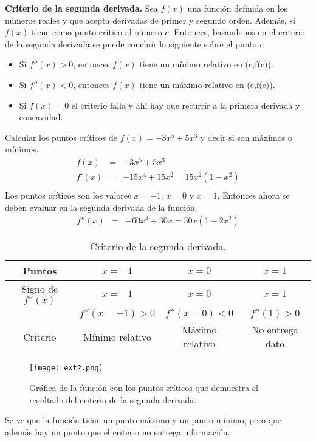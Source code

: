 \begin{mydef}
\textbf{Criterio de la segunda derivada. } Sea $f(x)$ una función definida en los números reales y que acepta derivadas de primer y segundo orden. Además, si $f(x)$ tiene como punto crítico al número $c$. Entonces, basandonos en el criterio de la segunda derivada se puede concluir lo siguiente sobre el punto $c$
\begin{itemize}
 \item Si $f''(x)>0$, entonces $f(x)$ tiene un mínimo relativo en (c,f(c)).
 \item Si $f''(x)<0$, entonces $f(x)$ tiene un máximo relativo en (c,f(c)).
 \item Si $f(x)=0$ el criterio falla y ahí hay que recurrir a la primera derivada y concavidad.
\end{itemize}
\end{mydef}

\begin{myexample}
Calcular los puntos críticos de $f(x)=-3x^{5}+5x^{3}$ y decir si son máximos o mínimos.
\begin{eqnarray*}
f(x)&=& -3x^{5}+5x^{3}\\
f'(x)&=&-15x^{4}+15x^{2}=15x^{2}(1-x^{2})\\
\end{eqnarray*}
Los puntos críticos son los valores $x=-1$, $x=0$ y $x=1$. Entonces ahora se deben evaluar en la segunda derivada de la función. 
\begin{eqnarray*}
f''(x)&=& -60x^{3}+30x=30x(1-2x^{2})
\end{eqnarray*}

\begin{table}[h!]
\begin{center}
		\begin{tabular}{|c|c|c|c|}
		\hline
		Puntos & $x=-1$   & $x=0$&$x=1$ \\ 
		\hline
		 Signo de $f''(x)$&$x=-1$ &$x=0$ &$x=1$   \\
		 & $f''(x=-1)>0$  & $f''(x=0)<0$&$f''(1)>0$  \\
		\hline
		Criterio &Mínimo relativo &Máximo relativo& No entrega dato \\
		\hline
		\end{tabular}
		\caption{Criterio de la segunda derivada.}
\end{center}
\end{table}

 \begin{center}
\begin{figure}[h!]
\centering
\texttt{[image: ext2.png]}
\caption{Gráfica de la función con los puntos críticos que demuestra el resultado del criterio de la segunda derivada.} \label{ext2}
\end{figure}
\end{center}

Se ve que la función tiene un punto máximo y un punto mínimo, pero que además hay un punto que el criterio no entrega información. 
\end{myexample}

